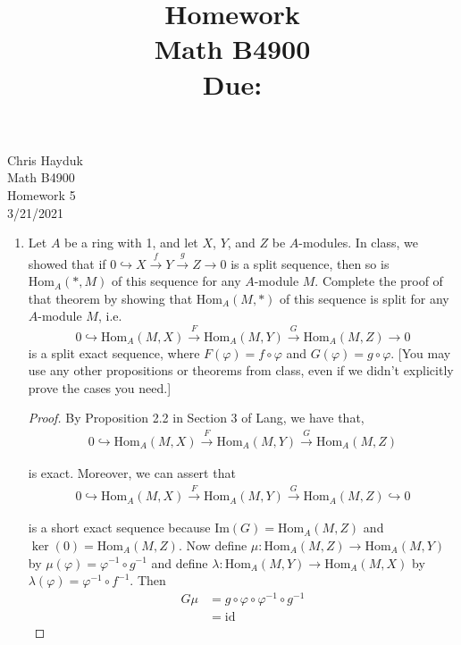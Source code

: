 \documentclass[11pt, reqno]{amsart}
\title[Homework \HW]{Homework \HW \\
Math B4900\\
\small Due: \DUE}
\author{}
\theoremstyle{plain}
\theoremstyle{definition}
\theoremstyle{example}
\def\Hom{\mathrm{Hom}}
\def\id{\mathrm{id}}
\def\f{\varphi}
\def\HW{5}
\def\DUE{3/21/2021}
\begin{document}
\begin{flushright}
Chris Hayduk\\
Math B4900\\
Homework \HW\\
\DUE
\end{flushright}



\begin{enumerate}[1.]
\item Let $A$ be a ring with 1, and let $X$, $Y$, and $Z$ be $A$-modules. In class, we showed that if $0 \hookrightarrow X \xrightarrow{f} Y \xrightarrow{g} Z \to 0$ is a split sequence, then so is $\Hom_A(*,M)$ of this sequence for any $A$-module $M$. Complete the proof of that theorem by showing that  $\Hom_A(M,*)$ of this sequence is split for any $A$-module $M$, i.e.
$$0 \hookrightarrow \Hom_A(M,X) \xrightarrow{F} \Hom_A(M, Y) \xrightarrow{G} \Hom_A(M,Z) \to 0$$
is a split exact sequence, where $F(\f) = f \circ \f$ and $G(\f) = g \circ \f$. {[You may use any other propositions or theorems from class, even if we didn't explicitly prove the cases you need.]}

\begin{proof}
By Proposition 2.2 in Section 3 of Lang, we have that,
\begin{align*}
0 \hookrightarrow \Hom_A(M,X) \xrightarrow{F} \Hom_A(M, Y) \xrightarrow{G} \Hom_A(M,Z)
\end{align*}

is exact. Moreover, we can assert that 
\begin{align*}
0 \hookrightarrow \Hom_A(M,X) \xrightarrow{F} \Hom_A(M, Y) \xrightarrow{G} \Hom_A(M,Z) \hookrightarrow 0
\end{align*}

is a short exact sequence because $\text{Im}(G) = \Hom_A(M,Z)$ and $\ker(0) = \Hom_A(M,Z)$. Now define $\mu: \Hom_A(M,Z) \to \Hom_A(M, Y)$ by $\mu(\varphi) = \varphi^{-1} \circ g^{-1}$ and define $\lambda: \Hom_A(M, Y) \to \Hom_A(M,X)$ by $\lambda(\varphi) = \varphi^{-1} \circ f^{-1}$. Then 
\begin{align*}
G\mu &= g \circ \varphi \circ \varphi^{-1} \circ g^{-1}\\
&= \id
\end{align*}


\end{proof}
\end{enumerate}
\end{document}
